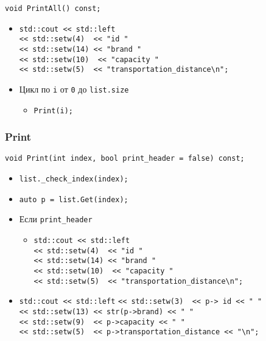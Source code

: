 \begin{lstlisting}
void PrintAll() const;
\end{lstlisting}

\begin{itemize}
	\item \verb|std::cout << std::left|\\
	\verb|<< std::setw(4)  << "id "|\\
	\verb|<< std::setw(14) << "brand "|\\
	\verb|<< std::setw(10)  << "capacity "|\\
	\verb|<< std::setw(5)  << "transportation_distance\n";|
	\item Цикл по \verb|i| от \verb|0| до \verb|list.size| 
	\begin{itemize}
		\item \verb|Print(i);|
	\end{itemize}
\end{itemize}


\subsubsection*{Print}

\begin{lstlisting}
void Print(int index, bool print_header = false) const;
\end{lstlisting}

\begin{itemize}
	\item \verb|list._check_index(index);|
	\item \verb|auto p = list.Get(index);|
	\item Если \verb|print_header|
	\begin{itemize}
		\item \verb|std::cout << std::left|\\
		\verb|<< std::setw(4)  << "id "|\\
		\verb|<< std::setw(14) << "brand "|\\
		\verb|<< std::setw(10)  << "capacity "|\\
		\verb|<< std::setw(5)  << "transportation_distance\n";|
	\end{itemize}
	\item \verb|std::cout << std::left|
	\verb|<< std::setw(3)  << p-> id << " "|\\
	\verb|<< std::setw(13) << str(p->brand) << " "|\\
	\verb|<< std::setw(9)  << p->capacity << " "|\\
	\verb|<< std::setw(5)  << p->transportation_distance << "\n";|
\end{itemize}


